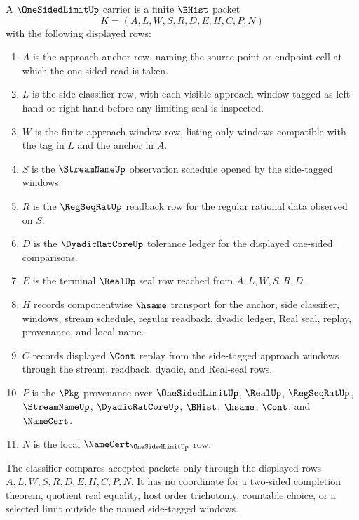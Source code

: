 \begin{definition}\label{def:one-sided-limit-carrier}
A $\OneSidedLimitUp$ carrier is a finite $\BHist$ packet
$$
K=(A,L,W,S,R,D,E,H,C,P,N)
$$
with the following displayed rows:
\begin{enumerate}
\item $A$ is the approach-anchor row, naming the source point or endpoint cell at which the one-sided read is taken.
\item $L$ is the side classifier row, with each visible approach window tagged as left-hand or right-hand before any limiting seal is inspected.
\item $W$ is the finite approach-window row, listing only windows compatible with the tag in $L$ and the anchor in $A$.
\item $S$ is the $\StreamNameUp$ observation schedule opened by the side-tagged windows.
\item $R$ is the $\RegSeqRatUp$ readback row for the regular rational data observed on $S$.
\item $D$ is the $\DyadicRatCoreUp$ tolerance ledger for the displayed one-sided comparisons.
\item $E$ is the terminal $\RealUp$ seal row reached from $A,L,W,S,R,D$.
\item $H$ records componentwise $\hsame$ transport for the anchor, side classifier, windows, stream schedule, regular readback, dyadic ledger, Real seal, replay, provenance, and local name.
\item $C$ records displayed $\Cont$ replay from the side-tagged approach windows through the stream, readback, dyadic, and Real-seal rows.
\item $P$ is the $\Pkg$ provenance over $\OneSidedLimitUp$, $\RealUp$, $\RegSeqRatUp$, $\StreamNameUp$, $\DyadicRatCoreUp$, $\BHist$, $\hsame$, $\Cont$, and $\NameCert$.
\item $N$ is the local $\NameCert_{\OneSidedLimitUp}$ row.
\end{enumerate}
The classifier compares accepted packets only through the displayed rows $A,L,W,S,R,D,E,H,C,P,N$. It has no coordinate for a two-sided completion theorem, quotient real equality, host order trichotomy, countable choice, or a selected limit outside the named side-tagged windows.
\end{definition}

